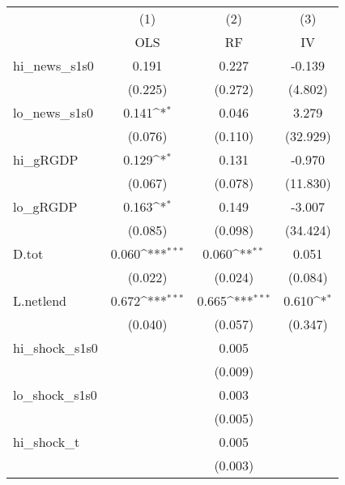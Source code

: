 {
\def\sym#1{\ifmmode^{#1}\else\(^{#1}\)\fi}
\begin{tabular}{l*{3}{c}}
\toprule
            &\multicolumn{1}{c}{(1)}&\multicolumn{1}{c}{(2)}&\multicolumn{1}{c}{(3)}\\
            &\multicolumn{1}{c}{OLS}&\multicolumn{1}{c}{RF}&\multicolumn{1}{c}{IV}\\
\midrule
hi\_news\_s1s0&       0.191         &       0.227         &      -0.139         \\
            &     (0.225)         &     (0.272)         &     (4.802)         \\
\addlinespace
lo\_news\_s1s0&       0.141\sym{*}  &       0.046         &       3.279         \\
            &     (0.076)         &     (0.110)         &    (32.929)         \\
\addlinespace
hi\_gRGDP    &       0.129\sym{*}  &       0.131         &      -0.970         \\
            &     (0.067)         &     (0.078)         &    (11.830)         \\
\addlinespace
lo\_gRGDP    &       0.163\sym{*}  &       0.149         &      -3.007         \\
            &     (0.085)         &     (0.098)         &    (34.424)         \\
\addlinespace
D.tot       &       0.060\sym{***}&       0.060\sym{**} &       0.051         \\
            &     (0.022)         &     (0.024)         &     (0.084)         \\
\addlinespace
L.netlend   &       0.672\sym{***}&       0.665\sym{***}&       0.610\sym{*}  \\
            &     (0.040)         &     (0.057)         &     (0.347)         \\
\addlinespace
hi\_shock\_s1s0&                     &       0.005         &                     \\
            &                     &     (0.009)         &                     \\
\addlinespace
lo\_shock\_s1s0&                     &       0.003         &                     \\
            &                     &     (0.005)         &                     \\
\addlinespace
hi\_shock\_t  &                     &       0.005         &                     \\
            &                     &     (0.003)         &                     \\

\end{tabular}}
